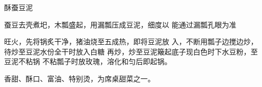 \begin{recipe}{酥蚕豆泥}

\ingredients


\cooking

\step 蚕豆去壳煮圯，木瓢盛起，用漏瓢压成豆泥，细度以 能通过漏瓢孔眼为准

\step 旺火，先将锅炙干净，猪油烧至五成热，即将豆泥放 入，不断用瓢子边搅边炒，待炒至豆泥水份全干时放入白糖 再炒，炒至豆泥簸起底子现白色时下水豆粉，至豆泥不粘锅 不粘瓢子时放玫瑰，溶化和匀后即起锅。

\notes

香甜、酥口、富油、特别烫，为席桌甜菜之一。

\end{recipe}

